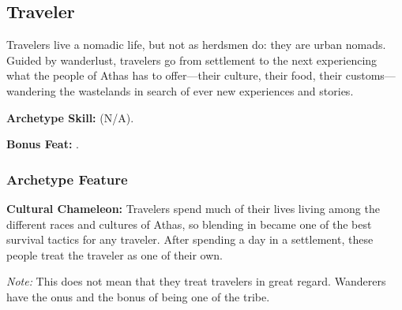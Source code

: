 \subsection{Traveler}
Travelers live a nomadic life, but not as herdsmen do: they are urban nomads. Guided by wanderlust, travelers go from settlement to the next experiencing what the people of Athas has to offer---their culture, their food, their customs---wandering the wastelands in search of ever new experiences and stories.

\textbf{Archetype Skill:}  (N/A).

\textbf{Bonus Feat:} .

\subsubsection{Archetype Feature}
\textbf{Cultural Chameleon:} Travelers spend much of their lives living among the different races and cultures of Athas, so blending in became one of the best survival tactics for any traveler. After spending a day in a settlement, these people treat the traveler as one of their own.

\textit{Note:} This does not mean that they treat travelers in great regard. Wanderers have the onus and the bonus of being one of the tribe.
